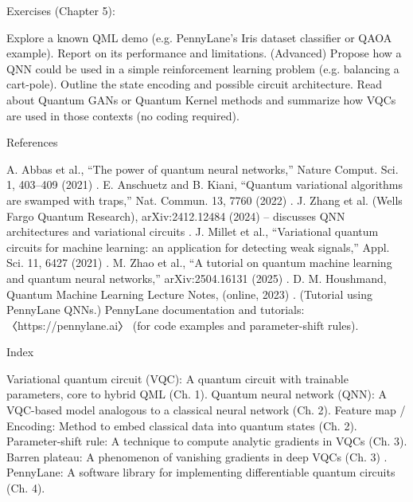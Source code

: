 Exercises (Chapter 5):



Explore a known QML demo (e.g. PennyLane’s Iris dataset classifier or QAOA example). Report on its performance and limitations.
(Advanced) Propose how a QNN could be used in a simple reinforcement learning problem (e.g. balancing a cart-pole). Outline the state encoding and possible circuit architecture.
Read about Quantum GANs or Quantum Kernel methods and summarize how VQCs are used in those contexts (no coding required).






References





A. Abbas et al., “The power of quantum neural networks,” Nature Comput. Sci. 1, 403–409 (2021) .
E. Anschuetz and B. Kiani, “Quantum variational algorithms are swamped with traps,” Nat. Commun. 13, 7760 (2022) .
J. Zhang et al. (Wells Fargo Quantum Research), arXiv:2412.12484 (2024) – discusses QNN architectures and variational circuits .
J. Millet et al., “Variational quantum circuits for machine learning: an application for detecting weak signals,” Appl. Sci. 11, 6427 (2021) .
M. Zhao et al., “A tutorial on quantum machine learning and quantum neural networks,” arXiv:2504.16131 (2025) .
D. M. Houshmand, Quantum Machine Learning Lecture Notes, (online, 2023) . (Tutorial using PennyLane QNNs.)
PennyLane documentation and tutorials: 〈https://pennylane.ai〉 (for code examples and parameter-shift rules).






Index





Variational quantum circuit (VQC): A quantum circuit with trainable parameters, core to hybrid QML (Ch. 1).
Quantum neural network (QNN): A VQC-based model analogous to a classical neural network (Ch. 2).
Feature map / Encoding: Method to embed classical data into quantum states (Ch. 2).
Parameter-shift rule: A technique to compute analytic gradients in VQCs (Ch. 3).
Barren plateau: A phenomenon of vanishing gradients in deep VQCs (Ch. 3) .
PennyLane: A software library for implementing differentiable quantum circuits (Ch. 4).
